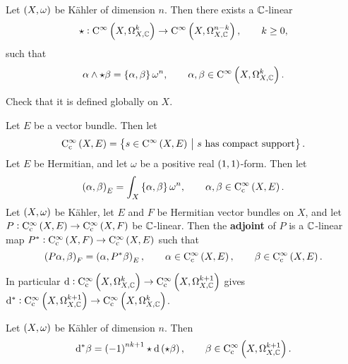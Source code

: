 \pagebreak

\begin{lemma}
Let $ \br{X, \omega} $ be K\"ahler of dimension $ n $. Then there exists a $ \mathbb{C} $-linear
$$ \star : \C^\infty\br{X, \Omega_{X, \CC}^k} \to \C^\infty\br{X, \Omega_{X, \CC}^{n - k}}, \qquad k \ge 0, $$
such that
$$ \alpha \wedge\star\beta = \cbr{\alpha, \beta}\omega^n, \qquad \alpha, \beta \in \C^\infty\br{X, \Omega_{X, \CC}^k}. $$
\end{lemma}

Check that it is defined globally on $ X $.

\begin{definition}
Let $ E $ be a vector bundle. Then let
$$ \C_\c^\infty\br{X, E} = \cbr{s \in \C^\infty\br{X, E} \st s \ \text{has compact support}}. $$
Let $ E $ be Hermitian, and let $ \omega $ be a positive real $ \br{1, 1} $-form. Then let
$$ \br{\alpha, \beta}_E = \int_X \cbr{\alpha, \beta}\omega^n, \qquad \alpha, \beta \in \C_\c^\infty\br{X, E}. $$
Let $ \br{X, \omega} $ be K\"ahler, let $ E $ and $ F $ be Hermitian vector bundles on $ X $, and let $ P : \C_\c^\infty\br{X, E} \to \C_\c^\infty\br{X, F} $ be $ \mathbb{C} $-linear. Then the \textbf{adjoint} of $ P $ is a $ \mathbb{C} $-linear map $ P^* : \C_\c^\infty\br{X, F} \to \C_\c^\infty\br{X, E} $ such that
$$ \br{P\alpha, \beta}_F = \br{\alpha, P^*\beta}_E, \qquad \alpha \in \C_\c^\infty\br{X, E}, \qquad \beta \in \C_\c^\infty\br{X, E}. $$
\end{definition}

In particular $ \d : \C_\c^\infty\br{X, \Omega_{X, \CC}^k} \to \C_\c^\infty\br{X, \Omega_{X, \CC}^{k + 1}} $ gives $ \d^* : \C_\c^\infty\br{X, \Omega_{X, \CC}^{k + 1}} \to \C_\c^\infty\br{X, \Omega_{X, \CC}^k} $.

\begin{lemma}
Let $ \br{X, \omega} $ be K\"ahler of dimension $ n $. Then
$$ \d^*\beta = \br{-1}^{nk + 1}\star\d\br{\star\beta}, \qquad \beta \in \C_\c^\infty\br{X, \Omega_{X, \CC}^{k + 1}}. $$
\end{lemma}

